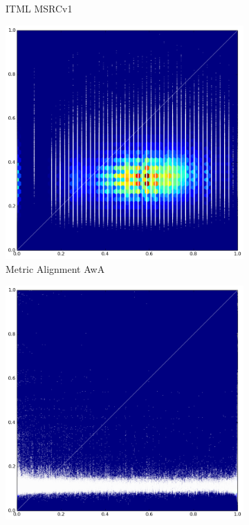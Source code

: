 \begin{figure}[p]
\begin{subfigure}{.5\textwidth}
  \caption{ITML MSRCv1}
  \label{fig:sub4}
\end{subfigure}
\begin{subfigure}{.5\textwidth}
  \centering
  \includegraphics[width=\textwidth]{Figures/Metric_Alignment_test_AwA}
  \caption{Metric Alignment AwA}
  \label{fig:sub5}
\end{subfigure}%
\begin{subfigure}{.5\textwidth}
  \centering
  \includegraphics[width=\textwidth]{Figures/Metric_Alignment_test_MSRCv1}

\end{subfigure}
\end{figure}
